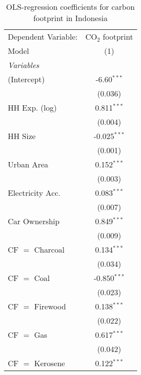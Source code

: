 
\begin{table}[htbp!]
   \centering
   \small
   \begin{adjustbox}{width = 1\textwidth, max height = 0.95\textheight, center}
      \begin{threeparttable}[b]
         \caption{\label{tab:OLS_2_IDN} OLS-regression coefficients for carbon footprint in Indonesia}
         \begin{tabular}{lc}
            \tabularnewline \midrule \midrule
            Dependent Variable: & CO$_{2}$ footprint\\  
            Model               & (1)\\  
            \midrule
            \emph{Variables}\\
            (Intercept)         & -6.60$^{***}$\\   
                                & (0.036)\\   
            HH Exp. (log)       & 0.811$^{***}$\\   
                                & (0.004)\\   
            HH Size             & -0.025$^{***}$\\   
                                & (0.001)\\   
            Urban Area          & 0.152$^{***}$\\   
                                & (0.003)\\   
            Electricity Acc.    & 0.083$^{***}$\\   
                                & (0.007)\\   
            Car Ownership       & 0.849$^{***}$\\   
                                & (0.009)\\   
            CF $=$ Charcoal     & 0.134$^{***}$\\   
                                & (0.034)\\   
            CF $=$ Coal         & -0.850$^{***}$\\   
                                & (0.023)\\   
            CF $=$ Firewood     & 0.138$^{***}$\\   
                                & (0.022)\\   
            CF $=$ Gas          & 0.617$^{***}$\\   
                                & (0.042)\\   
            CF $=$ Kerosene     & 0.122$^{***}$\\   

\end{tabular}
\end{threeparttable}
\end{adjustbox}
\end{table}
